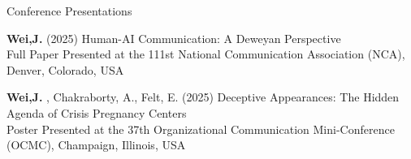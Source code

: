 \documentclass[
	11pt, %
]{resume} %
\begin{document}
\begin{rSection}{Conference Presentations}

    
	\textbf{Wei,J.} (2025) Human-AI Communication: A Deweyan Perspective\\
\textbullet\enspace Full Paper Presented at the 111st National Communication Association (NCA), Denver, Colorado, USA

	\textbf{Wei,J.} , Chakraborty, A., Felt, E. (2025) Deceptive Appearances: The Hidden Agenda of Crisis Pregnancy Centers \\
\textbullet\enspace Poster Presented at the 37th Organizational Communication Mini-Conference (OCMC), Champaign, Illinois, USA
	
\end{rSection}


\end{document}
